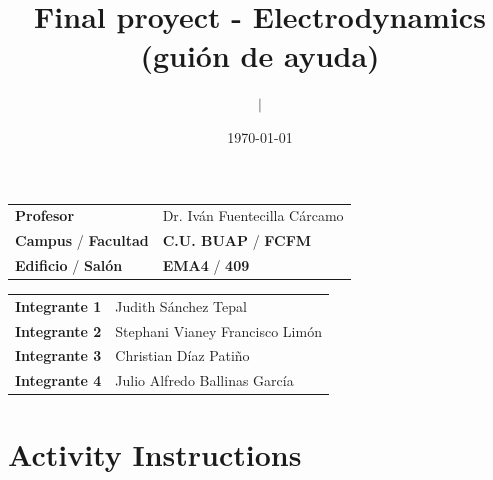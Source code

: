 \documentclass{article}
\title{\textcolor{Apple Green}{\textbf{Final proyect}} - \textcolor{Cinnabar}{\textbf{Electrodynamics (guión de ayuda)}}}
\author{\emph{} $\boldsymbol{\mid}$}
\date{\today}
\begin{document}
\maketitle



\begin{mybox}
\noindent\begin{tabular}{@{}ll}
	{\bfseries{Profesor}} & Dr. Iván Fuentecilla Cárcamo\\
	\textcolor{prussianblue}{\bfseries{Campus}} / \textcolor{trueblue}{\bfseries{Facultad}}  & \textcolor{prussianblue}{\bfseries{C.U. BUAP}} /  \textcolor{trueblue}{\bfseries{FCFM}} \\
	\textcolor{prussianblue}{\bfseries{Edificio}} /  \textcolor{trueblue}{\bfseries{Salón}}    & 	\textcolor{prussianblue}{\bfseries{EMA4}} /  \textcolor{trueblue}{\bfseries{409}}   
\end{tabular} 
\end{mybox} \vspace{1cm}


\begin{mybox}
\noindent\begin{tabular}{@{}ll}
	{\bfseries{Integrante 1}} & Judith Sánchez Tepal\\
	{\bfseries{Integrante 2}} & Stephani Vianey Francisco Limón\\
	{\bfseries{Integrante 3}} & Christian Díaz Patiño\\
	{\bfseries{Integrante 4}} & Julio Alfredo Ballinas García
\end{tabular} 
\end{mybox} \vspace{1cm}



\section*{Activity Instructions}
\end{document}
